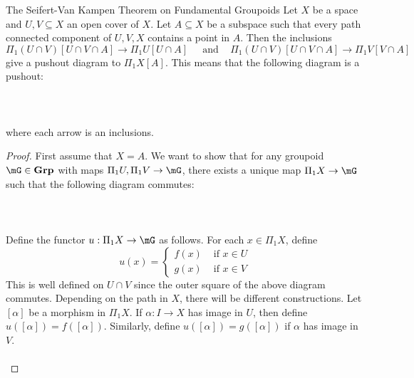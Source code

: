 \documentclass[a4paper]{article}
\begin{document}
\begin{thm}{The Seifert-Van Kampen Theorem on Fundamental Groupoids}{} Let $X$ be a space and $U,V\subseteq X$ an open cover of $X$. Let $A\subseteq X$ be a subspace such that every path connected component of $U,V,X$ contains a point in $A$. Then the inclusions $$\Pi_1(U\cap V)[U\cap V\cap A]\to\Pi_1U[U\cap A]\;\;\;\;\text{ and }\;\;\;\Pi_1(U\cap V)[U\cap V\cap A]\to\Pi_1V[V\cap A]$$ give a pushout diagram to $\Pi_1X[A]$. This means that the following diagram is a pushout: \\~\\
 \\~\\
where each arrow is an inclusions. 
\tcbline
\begin{proof}
First assume that $X=A$. We want to show that for any groupoid $\mG\in\bold{Grp}$ with maps $\Pi_1U,\Pi_1V\to\mG$, there exists a unique map $\Pi_1X\to\mG$ such that the following diagram commutes: \\~\\
\\~\\
Define the functor $u:\Pi_1X\to\mG$ as follows. For each $x\in\Pi_1X$, define $$u(x)=\begin{cases}
f(x) & \text{ if }x\in U\\
g(x) & \text{ if }x\in V
\end{cases}$$ This is well defined on $U\cap V$ since the outer square of the above diagram commutes. Depending on the path in $X$, there will be different constructions. Let $[\alpha]$ be a morphism in $\Pi_1X$. If $\alpha:I\to X$ has image in $U$, then define $u([\alpha])=f([\alpha])$. Similarly, define $u([\alpha])=g([\alpha])$ if $\alpha$ has image in $V$. \\~\\


\end{proof}
\end{thm}
\end{document}
